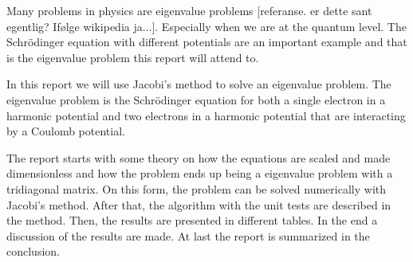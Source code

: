 Many problems in physics are eigenvalue problems [referanse. er dette sant egentlig? Ifølge wikipedia ja...]. Especially when we are at the quantum level. The Schrödinger equation with different potentials are an important example and that is the eigenvalue problem this report will attend to.

In this report we will use Jacobi's method to solve an eigenvalue problem. The eigenvalue problem is the Schrödinger equation for both a single electron in a harmonic potential and two electrons in a harmonic potential that are interacting by a Coulomb potential.

The report starts with some theory on how the equations are scaled and made dimensionless and how the problem ends up being a eigenvalue problem with a tridiagonal matrix. On this form, the problem can be solved numerically with Jacobi's method. After that, the algorithm with the unit tests are described in the method. Then, the results are presented in different tables. In the end a discussion of the results are made. At last the report is summarized in the conclusion.